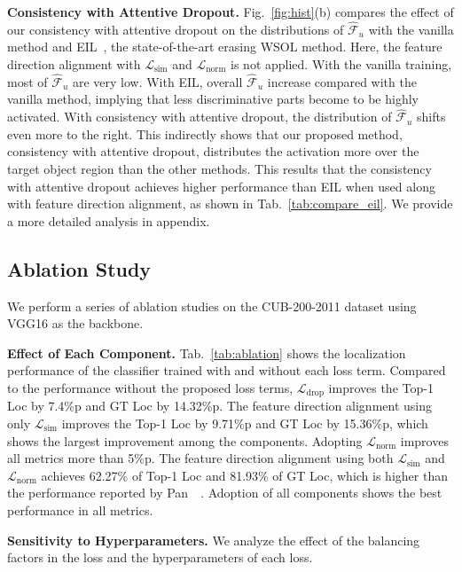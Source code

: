 \noindent\textbf{Consistency with Attentive Dropout.}
Fig.~\ref{fig:hist}(b) compares the effect of our consistency with attentive dropout on the distributions of $\hat{\mathcal{F}}_u$ with the vanilla method and EIL~\cite{mai2020erasing}, the state-of-the-art erasing WSOL method.
Here, the feature direction alignment with $\mathcal{L}_\text{sim}$ and $\mathcal{L}_\text{norm}$ is not applied.
With the vanilla training, most of $\hat{\mathcal{F}}_u$ are very low.
With EIL, overall $\hat{\mathcal{F}}_u$ increase compared with the vanilla method, implying that less discriminative parts become to be highly activated.
With consistency with attentive dropout, the distribution of $\hat{\mathcal{F}}_u$ shifts even more to the right.
This indirectly shows that our proposed method, consistency with attentive dropout, distributes the activation more over the target object region than the other methods. This results that the consistency with attentive dropout achieves higher performance than EIL when used along with feature direction alignment, as shown in Tab.~\ref{tab:compare_eil}. We provide a more detailed analysis in appendix.



\subsection{Ablation Study}\label{sec:ablation}
We perform a series of ablation studies on the CUB-200-2011 dataset using VGG16 as the backbone.

\noindent\textbf{Effect of Each Component.}
Tab.~\ref{tab:ablation} shows the localization performance of the classifier trained with and without each loss term.
Compared to the performance without the proposed loss terms, $\mathcal{L}_\text{drop}$ improves the Top-1 Loc by 7.4\%p and GT Loc by 14.32\%p.
The feature direction alignment using only $\mathcal{L}_\text{sim}$ improves the Top-1 Loc by 9.71\%p and GT Loc by 15.36\%p, which shows the largest improvement among the components.
Adopting $\mathcal{L}_\text{norm}$ improves all metrics more than 5\%p. The feature direction alignment using both $\mathcal{L}_\text{sim}$ and $\mathcal{L}_\text{norm}$ achieves 62.27\% of Top-1 Loc and 81.93\% of GT Loc, which is higher than the performance reported by Pan~\etal~\cite{pan2021unveiling}.
Adoption of all components shows the best performance in all metrics.

\noindent\textbf{Sensitivity to Hyperparameters.}
We analyze the effect of the balancing factors in the loss and the hyperparameters of each loss.

